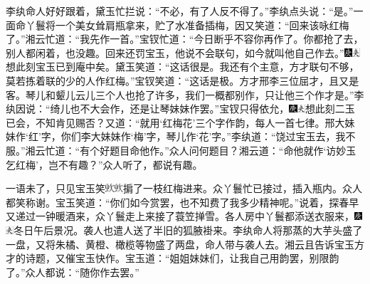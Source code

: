 李纨命人好好跟着，黛玉忙拦说：“不必，有了人反不得了。”李纨点头说：“是。”一面命丫鬟将一个美女耸肩瓶拿来，贮了水准备插梅，因又笑道：“回来该咏红梅了。”湘云忙道：“我先作一首。”宝钗忙道：“今日断乎不容你再作了。你都抢了去，别人都闲着，也没趣。回来还罚宝玉，他说不会联句，如今就叫他自己作去。”{\includegraphics[width=3mm]{../Images/00004}\includegraphics[width=3mm]{../Images/00012}\footnotesize \kaishu 想此刻宝玉已到庵中矣。}黛玉笑道：“这话很是。我还有个主意，方才联句不够，莫若拣着联的少的人作红梅。”宝钗笑道：“这话是极。方才邢李三位屈才，且又是客。琴儿和颦儿云儿三个人也抢了许多，我们一概都别作，只让他三个作才是。”李纨因说：“绮儿也不大会作，还是让琴妹妹作罢。”宝钗只得依允，{\includegraphics[width=3mm]{../Images/00004}\includegraphics[width=3mm]{../Images/00012}\footnotesize \kaishu 想此刻二玉已会，不知肯见赐否？}又道：“就用‘红梅花’三个字作韵，每人一首七律。邢大妹妹作‘红’字，你们李大妹妹作‘梅’字，琴儿作‘花’字。”李纨道：“饶过宝玉去，我不服。”湘云忙道：“有个好题目命他作。”众人问何题目？湘云道：“命他就作‘访妙玉乞红梅’，岂不有趣？”众人听了，都说有趣。

一语未了，只见宝玉笑\includegraphics[width=9.4pt,height=9.4pt,align=c,vshift=1pt]{../images/00025}\includegraphics[width=9.4pt,height=9.4pt,align=c,vshift=1pt]{../images/00025}掮了一枝红梅进来。众丫鬟忙已接过，插入瓶内。众人都笑称谢。宝玉笑道：“你们如今赏罢，也不知费了我多少精神呢。”说着，探春早又递过一钟暖酒来，众丫鬟走上来接了蓑笠掸雪。各人房中丫鬟都添送衣服来，{\includegraphics[width=3mm]{../Images/00004}\includegraphics[width=3mm]{../Images/00012}\footnotesize \kaishu 冬日午后景况。}袭人也遣人送了半旧的狐腋褂来。李纨命人将那蒸的大芋头盛了一盘，又将朱橘、黄橙、橄榄等物盛了两盘，命人带与袭人去。湘云且告诉宝玉方才的诗题，又催宝玉快作。宝玉道：“姐姐妹妹们，让我自己用韵罢，别限韵了。”众人都说：“随你作去罢。”

